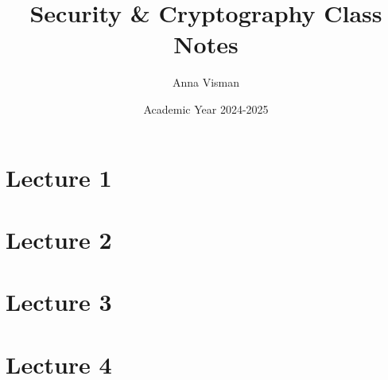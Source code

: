 \documentclass[10pt, oneside]{article}
\title{Security \& Cryptography Class Notes}
\author{Anna Visman}
\date{Academic Year 2024-2025}
\begin{document}
\maketitle
\tableofcontents

\vspace{.25in}

\section{Lecture 1}



\section{Lecture 2}



\section{Lecture 3}



\section{Lecture 4}


\end{document}
